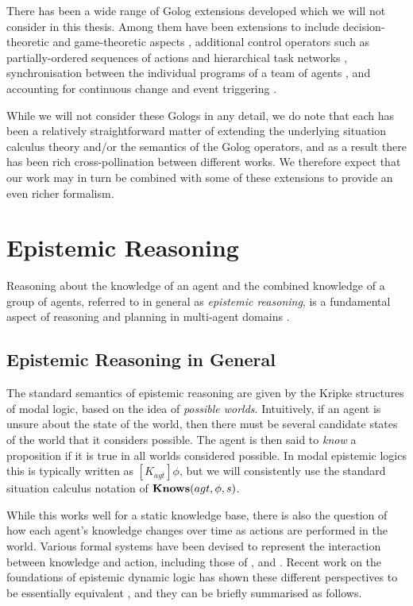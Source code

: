 There has been a wide range of Golog extensions developed which we
will not consider in this thesis. Among them have been extensions
to include decision-theoretic \citep{boutilier00dtgolog} and game-theoretic
aspects \citep{finzi03gtgolog,finzi05pogtgolog}, additional control
operators such as partially-ordered sequences of actions \citep{son00htn_golog}
and hierarchical task networks \citep{Gabaldon02htn_in_golog,Son04golog+htn+time},
synchronisation between the individual programs of a team of agents
\citep{farinelli07team_golog}, and accounting for continuous change
and event triggering \citep{grosskreutz00ccgolog}.

While we will not consider these Gologs in any detail, we do note
that each has been a relatively straightforward matter of extending
the underlying situation calculus theory and/or the semantics of the
Golog operators, and as a result there has been rich cross-pollination
between different works. We therefore expect that our work may in
turn be combined with some of these extensions to provide an even
richer formalism.


\section{Epistemic Reasoning\label{sec:Background:Epistemic}}

Reasoning about the knowledge of an agent and the combined knowledge
of a group of agents, referred to in general as \emph{epistemic reasoning},
is a fundamental aspect of reasoning and planning in multi-agent domains
\citep{halpern90knowledge_distrib}.


\subsection{Epistemic Reasoning in General}

The standard semantics of epistemic reasoning are given by the Kripke
structures of modal logic, based on the idea of \emph{possible worlds}.
Intuitively, if an agent is unsure about the state of the world, then
there must be several candidate states of the world that it considers
possible. The agent is then said to \emph{know} a proposition if it
is true in all worlds considered possible. In modal epistemic logics
this is typically written as $[K_{agt}]\phi$, but we will consistently
use the standard situation calculus notation of $\mathbf{Knows}(agt,\phi,s)$.

While this works well for a static knowledge base, there is also the
question of how each agent's knowledge changes over time as actions
are performed in the world. Various formal systems have been devised
to represent the interaction between knowledge and action, including
those of \citet{fagin95}, \citet{parikh85dist_knowledge} and \citet{baltag98pa_ck}.
Recent work on the foundations of epistemic dynamic logic has shown
these different perspectives to be essentially equivalent \citep{vanBentham06tree_of_knowledge,pacuit07history_structures},
and they can be briefly summarised as follows.

